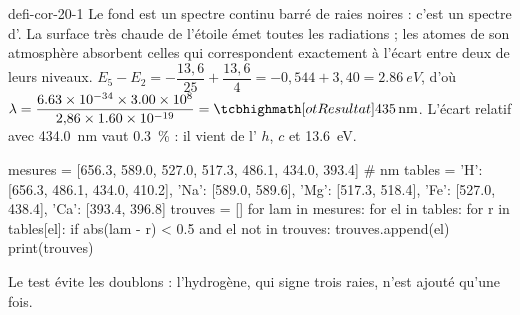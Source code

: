 \begin{blocEdition}{defi-cor-20-1}
Le fond est un spectre continu barré de raies noires : c'est un spectre d'. La surface très chaude de l'étoile émet
toutes les radiations ; les atomes de son atmosphère absorbent celles qui correspondent exactement à l'écart entre deux de leurs niveaux.
$E_5-E_2=-\dfrac{13{,}6}{25}+\dfrac{13{,}6}{4}=-0{,}544+3{,}40=\qty{2,86}{eV}$, d'où $\lambda=\dfrac{\num{6,63e-34}\times\num{3,00e8}}{2{,}86\times\num{1,60e-19}}=\res{\qty{435}{nm}}$. L'écart
relatif avec \qty{434,0}{nm} vaut \qty{0,3}{\percent} : il vient de l' $h$, $c$ et \qty{13,6}{eV}.
\begin{python}
mesures = [656.3, 589.0, 527.0, 517.3, 486.1, 434.0, 393.4]   # nm
tables = {'H': [656.3, 486.1, 434.0, 410.2], 'Na': [589.0, 589.6],
          'Mg': [517.3, 518.4], 'Fe': [527.0, 438.4], 'Ca': [393.4, 396.8]}
trouves = []
for lam in mesures:
    for el in tables:
        for r in tables[el]:
            if abs(lam - r) < 0.5 and el not in trouves:
                trouves.append(el)
print(trouves)
\end{python}
\begin{console}
['H', 'Na', 'Fe', 'Mg', 'Ca']
\end{console}
Le test  évite les doublons : l'hydrogène, qui signe trois raies, n'est ajouté qu'une fois.
\label{figedition-defi-cor-20-1-1}
\end{blocEdition}

